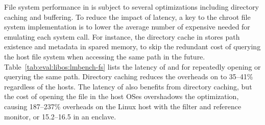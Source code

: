 \label{sec:eval:libos:fs}

File system performance in \thelibos{}
is subject to several optimizations including directory caching and buffering.
To reduce the impact of \hostapi{} latency,
a key to the chroot file system implementation
is to lower the average number of expensive \hostapis{}
needed for emulating each system call.
For instance, the directory cache
in \thelibos{} stores path existence and metadata
in spared \picoproc{} memory,
to skip the redundant cost
of querying the host file system
when accessing the same path in the future.
Table~\ref{tab:eval:libos:lmbench-fs} lists the latency of  and 
for repeatedly opening or querying the same path.
Directory caching
reduces the overheads on  to 35--41\%
regardless of the hosts.
The latency of 
also benefits from directory caching, but the cost of opening the file in the host OSes
overshadows the optimization,
causing 187--237\% overheads on the Linux host with the \seccomp{} filter and reference monitor,
or 15.2--16.5\x{} in an enclave.






